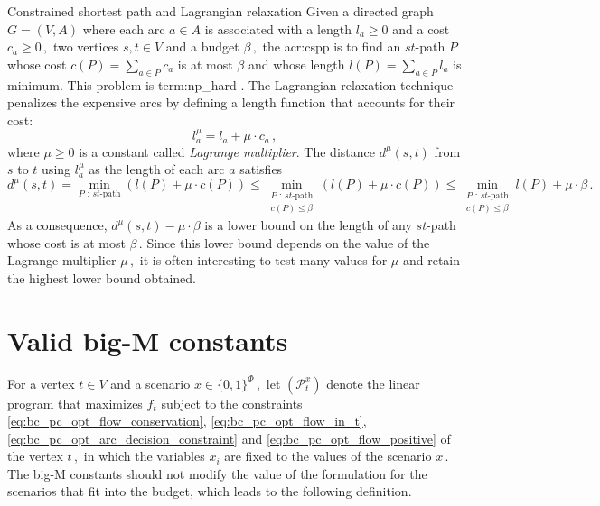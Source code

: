 \documentclass[11pt,a4paper]{report}
\theoremstyle{definition}
\theoremstyle{remark}
\begin{document}
\begin{tdefinitionbox}{Constrained shortest path and Lagrangian relaxation\label{box:def_cspp}}
  Given a directed graph $G=(V,A)$ where each arc $a \in A$ is associated with a length $l_a \geq 0$ and a cost $c_a \geq 0\,,$ two vertices $s,t \in V$ and a budget $\beta\,,$ the \gls{acr:cspp} is to find an $st$-path $P$ whose cost $c(P) = \sum_{a \in P} c_a$ is at most $\beta$ and whose length $l(P) = \sum_{a \in P} l_a$ is minimum. This problem is \gls{term:np_hard} \cite{CSP-LANGRAGIAN-RELAXATION_HANDLER_1980}. The Lagrangian relaxation technique \cite{CSP-LANGRAGIAN-RELAXATION_HANDLER_1980,CSP-LAGRANGIAN-RELAXATION_AHUJA_1993} penalizes the expensive arcs by defining a length function that accounts for their cost:
  \begin{equation}
    l^{\mu}_a = l_a + \mu \cdot c_a\,,
  \end{equation}
  where $\mu \geq 0$ is a constant called \textit{Lagrange multiplier}. The distance $d^{\mu}(s,t)$ from $s$ to $t$ using $l^{\mu}_a$ as the length of each arc $a$ satisfies
  \begin{equation}\label{eq:langragian_bound}
    d^{\mu}(s,t) = \min_{\text{$P$ : $st$-path}} \left(l(P) + \mu \cdot c(P)\right) \leq \min_{\substack{\text{$P$ : $st$-path} \\ c(P) \leq \beta}} \left(l(P) + \mu \cdot c(P)\right) \leq \min_{\substack{\text{$P$ : $st$-path} \\ c(P) \leq \beta}} l(P) + \mu \cdot \beta\,.
  \end{equation}
  As a consequence, $d^{\mu}(s,t) - \mu \cdot \beta$ is a lower bound on the length of any $st$-path whose cost is at most $\beta\,.$ Since this lower bound depends on the value of the Lagrange multiplier $\mu\,,$ it is often interesting to test many values for $\mu$ and retain the highest lower bound obtained.
\end{tdefinitionbox}


\section{Valid big-M constants}\label{sec:big_m_validity}

For a vertex $t \in V$ and a scenario $x \in \{0,1\}^\Phi\,,$ let $(\mathcal{P}^x_t)$ denote the linear program that maximizes $f_t$ subject to the constraints \eqref{eq:bc_pc_opt_flow_conservation}, \eqref{eq:bc_pc_opt_flow_in_t}, \eqref{eq:bc_pc_opt_arc_decision_constraint} and \eqref{eq:bc_pc_opt_flow_positive} of the vertex $t\,,$ in which the variables $x_i$ are fixed to the values of the scenario $x\,.$ The big-M constants should not modify the value of the formulation for the scenarios that fit into the budget, which leads to the following definition.
\end{document}

